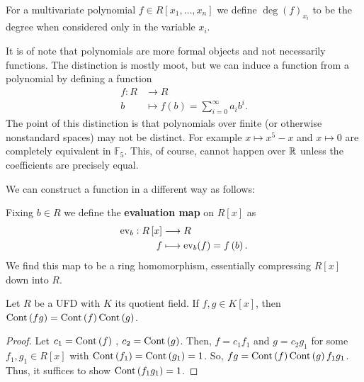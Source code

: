 \begin{definition}
	For a multivariate polynomial \(f \in R\left[ x_1, \ldots, x_{n} \right] \) we define \(\deg \left(  f \right) _{x_{i}}\) to be the degree when considered only in the variable \(x_{i}\).
\end{definition}
\begin{remark}
	It is of note that polynomials are more formal objects and not necessarily functions. The distinction is mostly moot, but we can induce a function from a polynomial by defining a function \begin{align*}
		f: R &\longrightarrow R \\
		b &\longmapsto f(b) = \sum_{i=0}^{\infty} a_{i}b^{i}
	.\end{align*}
	The point of this distinction is that polynomials over finite (or otherwise nonstandard spaces) may not be distinct. For example \(x \mapsto x^{5} - x\) and \(x \mapsto 0\) are completely equivalent in \(\mathbb{F}_5\). This, of course, cannot happen over \(\mathbb{R}\) unless the coefficients are precisely equal.
\end{remark}
We can construct a function in a different way as follows:
\begin{definition}
	Fixing \(b \in R\) we define the \textbf{evaluation map} on \(R\left[ x \right] \)  as \begin{align*}
		\operatorname{ev}_{b}: R\left[ x \right]   &\longrightarrow  R\\
		f &\longmapsto \operatorname{ev}_{b}(f) = f\left( b \right)
	.\end{align*}
	We find this map to be a ring homomorphism, essentially compressing \(R\left[ x \right] \) down into \(R\).
\end{definition}
\begin{lemma}
	Let \(R\) be a UFD with \(K\) its quotient field. If \(f, g \in K\left[ x \right] \), then \(\operatorname{Cont}\left( fg \right) = \operatorname{Cont}\left( f \right) \operatorname{Cont}\left( g \right) \).
\end{lemma}
\begin{proof}
	Let \(c_1 = \operatorname{Cont}\left( f \right) \) , \(c_2 =\operatorname{Cont}\left( g \right) \). Then, \(f = c_1 f_1\) and \(g = c_2 g_1\) for some \(f_1, g_1 \in R\left[ x \right] \) with \(\operatorname{Cont}\left( f_1 \right)  = \operatorname{Cont}\left( g_1 \right)  = 1\). So, \(fg = \operatorname{Cont}\left( f \right) \operatorname{Cont}\left( g \right) f_1g_1\).\\
	Thus, it suffices to show \(\operatorname{Cont}\left( f_1g_1 \right) = 1 \).
\end{proof}
